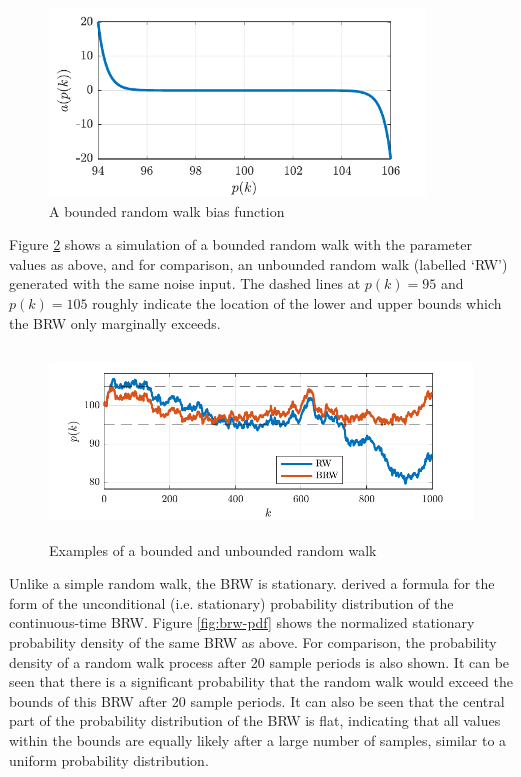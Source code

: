 \begin{figure}[htp]
	\centering
	\includegraphics[height=5cm]{images/brw_a.pdf}
	\caption{A bounded random walk bias function}
	\label{fig:brw-a}
\end{figure}

Figure \ref{fig:brw-sim} shows a simulation of a bounded random walk with the parameter values as above, and for comparison, an unbounded random walk (labelled `RW') generated with the same noise input. The dashed lines at $p(k)=95$ and $p(k)=105$ roughly indicate the location of the lower and upper bounds which the BRW only marginally exceeds.

\begin{figure}[htp]
	\centering
	\includegraphics[height=5cm]{images/brw_sim.pdf}
	\caption{Examples of a bounded and unbounded random walk}
	\label{fig:brw-sim}
\end{figure}

Unlike a simple random walk, the BRW is stationary. \cite{nicolau_stationary_2002} derived a formula for the form of the unconditional (i.e. stationary) probability distribution of the continuous-time BRW. Figure \ref{fig:brw-pdf} shows the normalized stationary probability density of the same BRW as above. For comparison, the probability density of a random walk process after 20 sample periods is also shown. It can be seen that there is a significant probability that the random walk would exceed the bounds of this BRW after 20 sample periods. It can also be seen that the central part of the probability distribution of the BRW is flat, indicating that all values within the bounds are equally likely after a large number of samples, similar to a uniform probability distribution.

